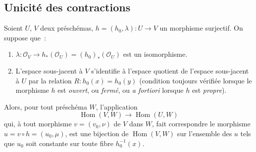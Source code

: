 \subsection{Unicité des contractions}
\label{subsection:II.8.11-fr}

\begin{lemma}[8.11.1]
\label{II.8.11.1-fr}
Soient $U$, $V$ deux préschémas,
$h=(h_0,\lambda):U\to V$ un morphisme surjectif. On suppose que~:
\begin{enumerate}
  \item[$1^\circ$]
  $\lambda:\mathcal{O}_V\to h_*(\mathcal{O}_U)
  =(h_0)_*(\mathcal{O}_U)$ est un isomorphisme.
  \item[$2^\circ$] L'espace sous-jacent à $V$ s'identifie à l'espace quotient
  de l'espace sous-jacent à $U$ par la relation
  $R:h_0(x)=h_0(y)$ \textup{(condition toujours vérifiée lorsque le morphisme $h$ est
  \emph{ouvert}, ou \emph{fermé}, ou \emph{a fortiori} lorsque $h$ est \emph{propre})}.
\end{enumerate}

Alors, pour tout préschéma $W$, l'application
\begin{equation}
\label{II.8.11.1.1-fr}
  \operatorname{Hom}(V,W)\longrightarrow\operatorname{Hom}(U,W)
\tag{8.11.1.1}
\end{equation}
qui, à tout morphisme $v=(v_0,\nu)$ de $V$ dans $W$, fait correspondre le
morphisme $u=v\circ h=(u_0,\mu)$, est une bijection de
$\operatorname{Hom}(V,W)$ sur l'ensemble des $u$ tels que $u_0$ soit
constante sur toute fibre $h_0^{-1}(x)$.
\end{lemma}

